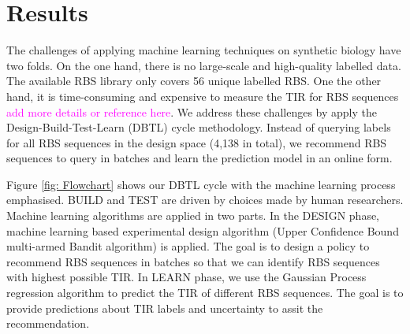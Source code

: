 \documentclass{article}
\newcommand{\mengyan}[1]{\textcolor{magenta}{#1}}
\begin{document}
\section{Results}

The challenges of applying machine learning techniques on synthetic biology have two folds.
On the one hand, there is no large-scale and high-quality labelled data. The available RBS library \cite{jervis2018machine} only covers 56 unique labelled RBS.
One the other hand, it is time-consuming and expensive to measure the TIR for RBS sequences \mengyan{add more details or reference here}. 
We address these challenges by 
apply the Design-Build-Test-Learn (DBTL) cycle methodology.
Instead of querying labels for all RBS sequences in the design space (4,138 in total), we recommend RBS sequences to query in batches and learn the prediction model in an online form. 

Figure \ref{fig: Flowchart} shows our DBTL cycle with the machine learning process emphasised.
BUILD and TEST are driven by choices made by human researchers.
Machine learning algorithms are applied in two parts.
In the DESIGN phase, machine learning based experimental design algorithm (Upper Confidence Bound multi-armed Bandit algorithm) is applied.
The goal is to design a policy to recommend RBS sequences in batches so that we can identify RBS sequences with highest possible TIR. 
In LEARN phase, we use the Gaussian Process regression algorithm to predict the TIR of different RBS sequences.
The goal is to provide predictions about TIR labels and uncertainty to assit the recommendation.\\
\end{document}
